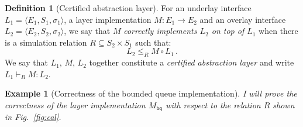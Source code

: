 \documentclass[11pt,oneside,draft]{book}
\newtheorem{example}[theorem]{Example}
\theoremstyle{definition}
\newtheorem{definition}[theorem]{Definition}
\newcommand{\kw}[1]{\ensuremath{ \mathsf{#1} }}
\begin{document}
\begin{definition}[Certified abstraction layer] %
For an underlay interface $L_1 = \langle E_1, S_1, \sigma_1 \rangle$,
a layer implementation $M : E_1 \rightarrow E_2$ and
an overlay interface $L_2 = \langle E_2, S_2, \sigma_2 \rangle$,
we say that $M$
\emph{correctly implements $L_2$ on top of $L_1$}
when there is a simulation relation $R \subseteq S_2 \times S_1$
such that:
\[
  L_2 \le_R M \circ L_1 \,.
\]
We say that $L_1$, $M$, $L_2$ together
constitute a \emph{certified abstraction layer}
and write $L_1 \vdash_R M : L_2$.
\end{definition}

\begin{example}[Correctness of the bounded queue implementation] %
I will prove the correctness of
the layer implementation $M_\kw{bq}$
with respect to the relation $R$
shown in Fig.~\ref{fig:cal}.


\end{example}
\end{document}
